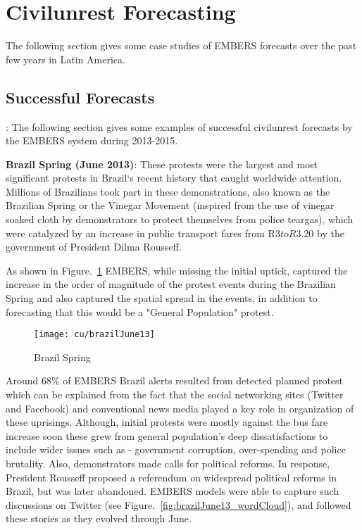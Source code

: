\section{Civilunrest Forecasting}
The following section gives some case studies of EMBERS forecasts over
the past few years in Latin America.

\subsection{Successful Forecasts}:
The following section gives some examples of successful civilunrest
forecasts by the EMBERS system during 2013-2015.

\textbf{Brazil Spring (June 2013)}: These protests were the largest and most
significant protests in Brazil`s recent history that caught worldwide
attention. Millions of Brazilians took part in these demonstrations,
also known as the Brazilian Spring or the Vinegar Movement (inspired
from the use of vinegar soaked cloth by demonstrators to protect
themselves from police teargas), which were catalyzed by an increase in
public transport fares from R$3 to R$3.20 by the government of President
Dilma Rousseff.

As shown in Figure.~\ref{fig:brazilJune13} EMBERS, while missing the initial uptick,
captured the increase in the order of magnitude of the protest events
during the Brazilian Spring and also captured
the spatial spread in the events, in addition to forecasting that this would be
a "General Population" protest.

\begin{figure}[H]
\texttt{[image: cu/brazilJune13]}
\caption{Brazil Spring}
\label{fig:brazilJune13}
\end{figure}

Around 68\% of EMBERS Brazil alerts resulted from detected planned
protest which can be explained from the fact that the social networking
sites (Twitter and Facebook) and conventional news media played a key
role in organization of these uprisings. Although, initial protests were
mostly against the bus fare increase soon these grew from general
population's deep dissatisfactions to include wider issues such as -
government corruption, over-spending and police brutality. Also,
demonstrators made calls for political reforms. In response, President
Rousseff proposed a referendum on widespread political reforms in
Brazil, but was later abandoned. EMBERS models were able to capture such
discussions on Twitter (see Figure.~\ref{fig:brazilJune13_wordCloud}), and followed these stories as
they evolved through June.

